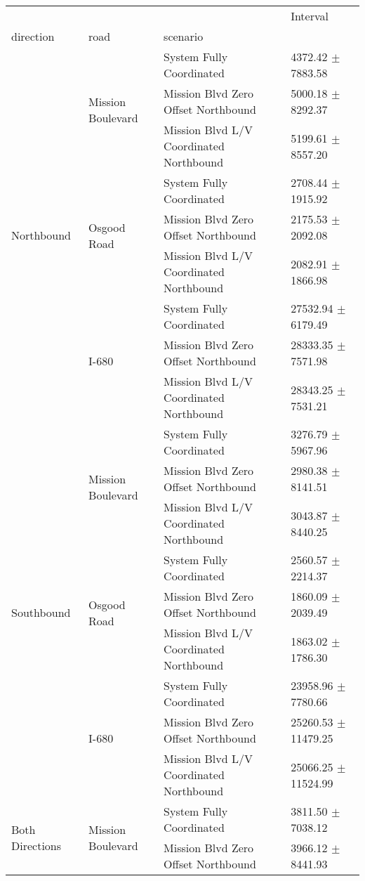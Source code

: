 \begin{tabular}{llll}
\toprule
 &  &  & Interval \\
direction & road & scenario &  \\
\midrule
\multirow[t]{9}{*}{Northbound} & \multirow[t]{3}{*}{Mission Boulevard} & System Fully Coordinated & 4372.42 $\pm$ 7883.58 \\
 &  & Mission Blvd Zero Offset Northbound & 5000.18 $\pm$ 8292.37 \\
 &  & Mission Blvd L/V Coordinated Northbound & 5199.61 $\pm$ 8557.20 \\
 & \multirow[t]{3}{*}{Osgood Road} & System Fully Coordinated & 2708.44 $\pm$ 1915.92 \\
 &  & Mission Blvd Zero Offset Northbound & 2175.53 $\pm$ 2092.08 \\
 &  & Mission Blvd L/V Coordinated Northbound & 2082.91 $\pm$ 1866.98 \\
 & \multirow[t]{3}{*}{I-680} & System Fully Coordinated & 27532.94 $\pm$ 6179.49 \\
 &  & Mission Blvd Zero Offset Northbound & 28333.35 $\pm$ 7571.98 \\
 &  & Mission Blvd L/V Coordinated Northbound & 28343.25 $\pm$ 7531.21 \\
\multirow[t]{9}{*}{Southbound} & \multirow[t]{3}{*}{Mission Boulevard} & System Fully Coordinated & 3276.79 $\pm$ 5967.96 \\
 &  & Mission Blvd Zero Offset Northbound & 2980.38 $\pm$ 8141.51 \\
 &  & Mission Blvd L/V Coordinated Northbound & 3043.87 $\pm$ 8440.25 \\
 & \multirow[t]{3}{*}{Osgood Road} & System Fully Coordinated & 2560.57 $\pm$ 2214.37 \\
 &  & Mission Blvd Zero Offset Northbound & 1860.09 $\pm$ 2039.49 \\
 &  & Mission Blvd L/V Coordinated Northbound & 1863.02 $\pm$ 1786.30 \\
 & \multirow[t]{3}{*}{I-680} & System Fully Coordinated & 23958.96 $\pm$ 7780.66 \\
 &  & Mission Blvd Zero Offset Northbound & 25260.53 $\pm$ 11479.25 \\
 &  & Mission Blvd L/V Coordinated Northbound & 25066.25 $\pm$ 11524.99 \\
\multirow[t]{9}{*}{Both Directions} & \multirow[t]{3}{*}{Mission Boulevard} & System Fully Coordinated & 3811.50 $\pm$ 7038.12 \\
 &  & Mission Blvd Zero Offset Northbound & 3966.12 $\pm$ 8441.93 \\

\end{tabular}
